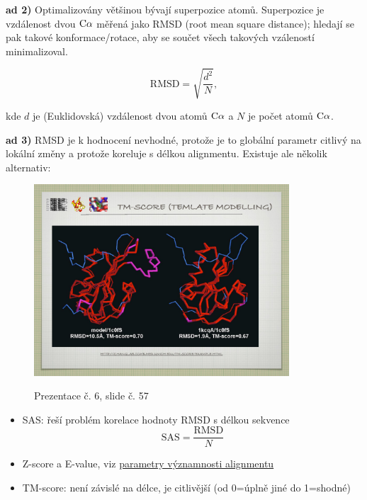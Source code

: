 \documentclass[DIV=8]{scrreprt}
\begin{document}
\textbf{ad 2)} Optimalizovány většinou bývají superpozice atomů. Superpozice je vzdálenost dvou \(\ce{C\alpha}\) měřená jako RMSD (root mean square distance); hledají se pak takové konformace/rotace, aby se součet všech takových vzáleností minimalizoval.

\[\text{RMSD} = \sqrt{\frac{d^2}{N}},\]

kde \(d\) je (Euklidovská) vzdálenost dvou atomů \(\ce{C\alpha}\) a \(N\) je počet atomů \(\ce{C\alpha}\).

\textbf{ad 3)} RMSD je k hodnocení nevhodné, protože je to globální parametr citlivý na lokální změny a protože koreluje s délkou alignmentu. Existuje ale několik alternativ:

\begin{figure}
    \caption{Prezentace č. 6, slide č. 57}
    \includegraphics[width=0.85\textwidth]{slides-6/slide-57.jpg}
    \centering
    \label{slides-6-slide-57}
\end{figure}

\begin{itemize}[nosep]
    \item SAS: řeší problém korelace hodnoty RMSD s délkou sekvence
  \[\text{SAS} = \frac{\text{RMSD}}{N}\]
    \item Z-score a E-value, viz \hyperref[Parametry významnosti alignmentu]{para­me­try výz­nam­nos­ti align­men­tu}
    \item TM-score: není závislé na délce, je citlivější (od 0=úplně jiné do 1=shodné)
\end{itemize}
\end{document}
